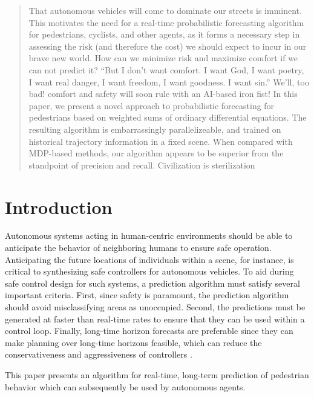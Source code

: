 \documentclass[conference]{IEEEtran}
\begin{document}
\begin{abstract}
That autonomous vehicles will come to dominate our streets is imminent.
This motivates the need for a real-time probabilistic forecasting algorithm for pedestrians, cyclists, and other agents,
as it forms a necessary step in assessing the risk (and therefore the cost) we should expect to incur in our brave new world.
How can we minimize risk and maximize comfort if we can not predict it?
``But I don't want comfort. I want God, I want poetry, I want real danger, I want freedom, I want goodness. I want sin.''
We'll, too bad! comfort and safety will soon rule with an AI-based iron fist! In this paper, we present a novel approach to probabilistic forecasting for pedestrians based on weighted sums of ordinary differential equations.
The resulting algorithm is embarrassingly parallelizeable, and trained on historical trajectory information in a fixed scene.
When compared with MDP-based methods, our algorithm appears to be superior from the standpoint of precision and recall.
Civilization is sterilization
\end{abstract}

\IEEEpeerreviewmaketitle

\section{Introduction}

Autonomous systems acting in human-centric environments should be able to anticipate the behavior of neighboring humans to ensure safe operation. 
Anticipating the future locations of individuals within a scene, for instance, is critical to synthesizing safe controllers for autonomous vehicles.
To aid during safe control design for such systems, a prediction algorithm must satisfy several important criteria.
First, since safety is paramount, the prediction algorithm should avoid misclassifying areas as unoccupied.
Second, the predictions must be generated at faster than real-time rates to ensure that they can be used within a control loop.
Finally, long-time horizon forecasts are preferable since they can make planning over long-time horizons feasible, which can reduce the conservativeness and aggressiveness of controllers \cite{}.


This paper presents an algorithm for real-time, long-term prediction of pedestrian behavior which can subsequently be used by autonomous agents.
\end{document}
